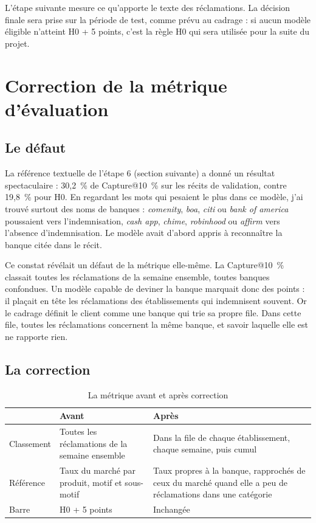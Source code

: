 \documentclass[11pt,a4paper]{article}
\begin{document}
L'étape suivante mesure ce qu'apporte le texte des réclamations. La décision finale sera prise sur la période de test, comme prévu au cadrage : si aucun modèle éligible n'atteint H0 + 5 points, c'est la règle H0 qui sera utilisée pour la suite du projet.

\section{Correction de la métrique d'évaluation}
\label{sec:correction}

\subsection{Le défaut}

La référence textuelle de l'étape 6 (section suivante) a donné un résultat spectaculaire : 30,2~\% de Capture@10~\% sur les récits de validation, contre 19,8~\% pour H0. En regardant les mots qui pesaient le plus dans ce modèle, j'ai trouvé surtout des noms de banques : \emph{comenity}, \emph{boa}, \emph{citi} ou \emph{bank of america} poussaient vers l'indemnisation, \emph{cash app}, \emph{chime}, \emph{robinhood} ou \emph{affirm} vers l'absence d'indemnisation. Le modèle avait d'abord appris à reconnaître la banque citée dans le récit.

Ce constat révélait un défaut de la métrique elle-même. La Capture@10~\% classait toutes les réclamations de la semaine ensemble, toutes banques confondues. Un modèle capable de deviner la banque marquait donc des points : il plaçait en tête les réclamations des établissements qui indemnisent souvent. Or le cadrage définit le client comme une banque qui trie sa propre file. Dans cette file, toutes les réclamations concernent la même banque, et savoir laquelle elle est ne rapporte rien.

\subsection{La correction}

\begin{table}[H]
\centering\small
\begin{tabularx}{\linewidth}{@{}l Y Y@{}}
\toprule
& Avant & Après \\
\midrule
Classement & Toutes les réclamations de la semaine ensemble & Dans la file de chaque établissement, chaque semaine, puis cumul \\
Référence & Taux du marché par produit, motif et sous-motif & Taux propres à la banque, rapprochés de ceux du marché quand elle a peu de réclamations dans une catégorie \\
Barre & H0 + 5 points & Inchangée \\
\bottomrule
\end{tabularx}
\caption{La métrique avant et après correction}
\end{table}
\end{document}
